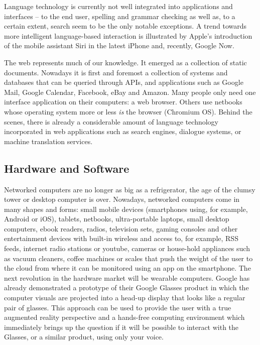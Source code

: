 \documentclass[10pt, plain]{../../metanetpaper}
\begin{document}
\begin{multicols}{2}
Language technology is currently not well integrated into applications and interfaces -- to the end user, spelling and grammar checking as well as, to a certain extent, search seem to be the only notable exceptions. A trend towards more intelligent language-based interaction is illustrated by Apple’s introduction of the mobile assistant Siri in the latest iPhone and, recently, Google Now.

The web represents much of our knowledge. It emerged as a collection of static documents. Nowadays it is first and foremost a collection of systems and databases that can be queried through APIs, and applications such as Google Mail, Google Calendar, Facebook, eBay and Amazon. Many people only need one interface application on their computers: a web browser. Others use netbooks whose operating system more or less \emph{is} the browser (Chromium OS). Behind the scenes, there is already a considerable amount of language technology incorporated in web applications such as search engines, dialogue systems, or machine translation services.


\subsection{Hardware and Software}
\label{sec:hardware-software}

Networked computers are no longer as big as a refrigerator, the age of the clumsy tower or desktop computer is over. Nowadays, networked computers come in many shapes and forms: small mobile devices (smartphones using, for example, Android or iOS), tablets, netbooks, ultra-portable laptops, small desktop computers, ebook readers, radios, television sets, gaming consoles and other entertainment devices with built-in wireless and access to, for example, RSS feeds, internet radio stations or youtube, cameras or house-hold appliances such as vacuum cleaners, coffee machines or scales that push the weight of the user to the cloud from where it can be monitored using an app on the smartphone. The next revolution in the hardware market will be wearable computers. Google has already demonstrated a prototype of their Google Glasses product in which the computer visuals are projected into a head-up display that looks like a regular pair of glasses. This approach can be used to provide the user with a true augmented reality perspective and a hands-free computing environment which immediately brings up the question if it will be possible to interact with the Glasses, or a similar product, using only your voice.


\end{multicols}
\end{document}
